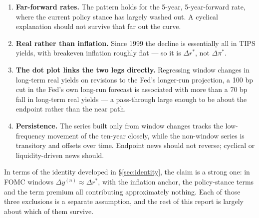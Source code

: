 \begin{enumerate}\setlength\itemsep{0.2em}
\item \textbf{Far-forward rates.} The pattern holds for the 5-year, 5-year-forward rate, where
the current policy stance has largely washed out. A cyclical explanation should not survive
that far out the curve.
\item \textbf{Real rather than inflation.} Since 1999 the decline is essentially all in TIPS
yields, with breakeven inflation roughly flat --- so it is $\Delta r^{*}$, not $\Delta\pi^{*}$.
\item \textbf{The dot plot links the two legs directly.} Regressing window changes in
long-term real yields on revisions to the Fed's longer-run projection, a 100 bp cut in the
Fed's own long-run forecast is associated with more than a 70 bp fall in long-term real
yields --- a pass-through large enough to be about the endpoint rather than the near path.
\item \textbf{Persistence.} The series built only from window changes tracks the low-frequency
movement of the ten-year closely, while the non-window series is transitory and offsets over
time. Endpoint news should not reverse; cyclical or liquidity-driven news should.
\end{enumerate}

\noindent In terms of the identity developed in \S\ref{sec:identity}, the claim is a strong
one: in FOMC windows $\Delta y^{(n)} \approx \Delta r^{*}$, with the inflation anchor, the
policy-stance terms and the term premium all contributing approximately nothing. Each of
those three exclusions is a separate assumption, and the rest of this report is largely about
which of them survive.
